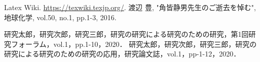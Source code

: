 \documentclass[a4paper,11pt,uplatex]{ujreport}
\begin{document}
\renewcommand{\bibname}{参考文献}

\begin{thebibliography}{99}
   Latex Wiki. \url{https://texwiki.texjp.org/}.
   渡辺 豊, "角皆静男先生のご逝去を悼む", 地球化学, vol.50, no.1, pp.1-3, 2016.
\end{thebibliography}

% 
% 

\label{chap:Bibiliography}

\renewcommand{\bibname}{研究業績}

\begin{thebibliography}{99}
  \bibitem{} 研究太郎，研究次郎，研究三郎，研究の研究による研究のための研究，第1回研究フォーラム，vol.1，pp.1-10，2020．
  \bibitem{} 研究太郎，研究次郎，研究三郎，研究の研究による研究のための研究の応用，研究論文誌，vol.1，pp-1-12，2020．
\end{thebibliography}

\label{chap:Publications}

\end{document}
